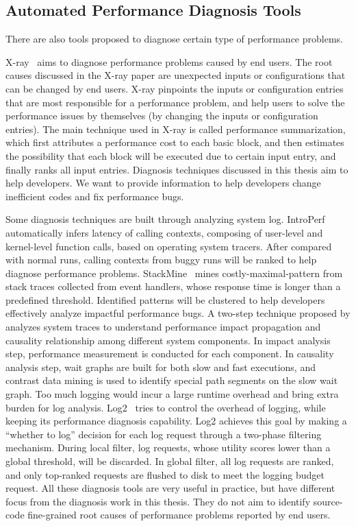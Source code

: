 \subsection{Automated Performance Diagnosis Tools}
There are also tools proposed to diagnose certain
type of performance problems.

X-ray~\citep{XRayOSDI} aims to diagnose performance 
problems caused by end users. The root causes discussed in the X-ray paper are 
unexpected inputs or configurations that can be changed by end users. 
X-ray pinpoints the inputs or configuration entries that are most 
responsible for a performance problem, and help users to solve the 
performance issues by themselves (by changing the inputs or configuration
entries). 
The main technique used in X-ray is called performance summarization, which 
first attributes a performance 
cost to each basic block, and then estimates the possibility that each block 
will be executed 
due to certain input entry, and finally ranks all input entries.
Diagnosis techniques discussed in this thesis aim to help developers. 
We want to provide 
information to help developers change inefficient codes and fix performance bugs.

Some diagnosis techniques are built through analyzing system log. 
IntroPerf~\citep{IntroPerf} automatically infers latency of calling contexts, 
composing of user-level and kernel-level function calls, 
based on operating system tracers. 
After compared with normal runs, 
calling contexts from buggy runs will be ranked to help diagnose performance problems. 
StackMine~\citep{TaoICSE2012} mines costly-maximal-pattern from stack traces collected from event handlers, 
whose response time is longer than a predefined threshold. 
Identified patterns will be clustered to help developers effectively analyze impactful performance bugs. 
A two-step technique proposed by \citet{TaoAsplos2014} analyzes system traces to 
understand performance impact propagation and causality relationship among different system components. 
In impact analysis step, performance measurement is conducted for each component. 
In causality analysis step, 
wait graphs are built for both slow and fast executions, 
and contrast data mining is used to identify special path segments on the slow wait graph. 
Too much logging would incur a large runtime overhead and bring extra burden for log analysis. 
Log2~\citep{TaoATC2015} tries to control the overhead of logging, 
while keeping its performance diagnosis capability. 
Log2 achieves this goal by making a ``whether to log'' decision for each log request through a two-phase filtering mechanism. 
During local filter, log requests, whose utility scores lower than a global threshold, will be discarded. 
In global filter, all log requests are ranked, 
and only top-ranked requests are flushed to disk to meet the logging budget request. 
All these diagnosis tools are very useful in practice, but have different
focus from the diagnosis work in this thesis. They
do not aim to identify source-code fine-grained 
root causes of performance problems reported by end users.


